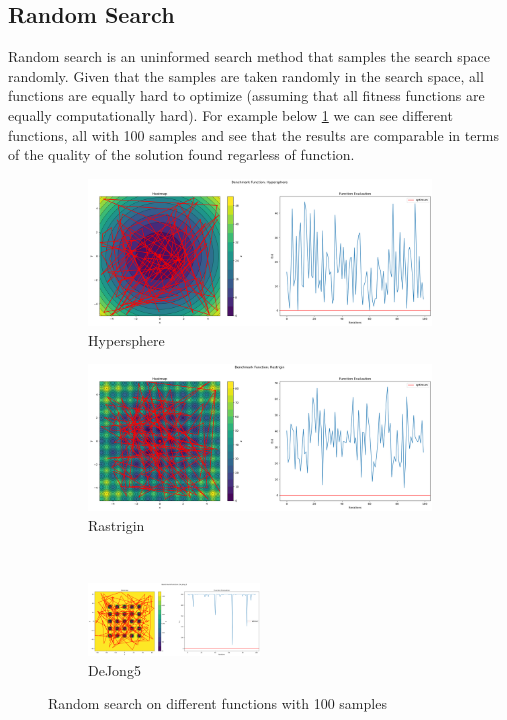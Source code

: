 \subsection{Random Search}
\label{sec:random-search}
Random search is an uninformed search method that samples the search space randomly.
Given that the samples are taken randomly in the search space, all functions are equally hard to optimize (assuming that all fitness functions are equally computationally hard). For example below \ref{fig:rs-100} we can see different functions, all with 100 samples and see that the results are comparable in terms of the quality of the solution found regarless of function.

\begin{figure}[H]
    \begin{subfigure}{0.5\textwidth}
        \includegraphics[width=\textwidth]{lab1/imgs/rs_sphere_100.png}
        \caption{Hypersphere}
    \end{subfigure}
    \begin{subfigure}{0.5\textwidth}
        \includegraphics[width=\textwidth]{lab1/imgs/rs_rastrigin_100.png}
        \caption{Rastrigin}
    \end{subfigure} \\
    \begin{subfigure}{\textwidth}
        \centering
        \includegraphics[width=0.5\textwidth]{lab1/imgs/rs_dejong_100.png}
        \caption{DeJong5}
    \end{subfigure}
    \caption{Random search on different functions with 100 samples}
    \label{fig:rs-100}
\end{figure}

